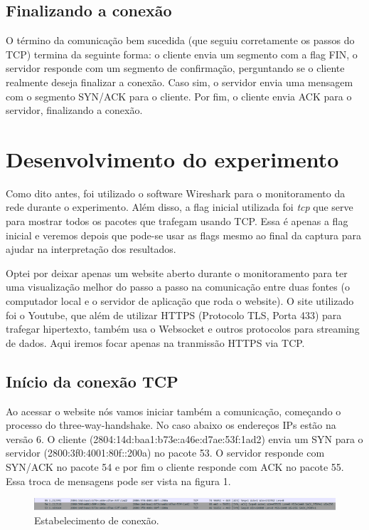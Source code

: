 \documentclass[12pt]{article}
\begin{document}
\subsection{Finalizando a conexão}

O término da comunicação bem sucedida (que seguiu corretamente os passos do TCP) termina da seguinte forma: o cliente envia um segmento com a flag FIN, o servidor responde com um segmento de confirmação, perguntando se o cliente realmente deseja finalizar a conexão. Caso sim, o servidor envia uma mensagem com o segmento SYN/ACK para o cliente. Por fim, o cliente envia ACK para o servidor, finalizando a conexão.

\section{Desenvolvimento do experimento}

Como dito antes, foi utilizado o software Wireshark para o monitoramento da rede durante o experimento. Além disso, a flag inicial utilizada foi \emph{tcp} que serve para mostrar todos os pacotes que trafegam usando TCP. Essa é apenas a flag inicial e veremos depois que pode-se usar as flags mesmo ao final da captura para ajudar na interpretação dos resultados.

Optei por deixar apenas um website aberto durante o monitoramento para ter uma visualização melhor do passo a passo na comunicação entre duas fontes (o computador local e o servidor de aplicação que roda o website). O site utilizado foi o Youtube, que além de utilizar HTTPS (Protocolo TLS, Porta 433) para trafegar hipertexto, também usa o Websocket e outros protocolos para streaming de dados. Aqui iremos focar apenas na tranmissão HTTPS via TCP.

\subsection{Início da conexão TCP}

Ao acessar o website nós vamos iniciar também a comunicação, começando o processo do three-way-handshake. No caso abaixo os endereços IPs estão na versão 6. O cliente (2804:14d:baa1:b73e:a46e:d7ae:53f:1ad2) envia um SYN para o servidor (2800:3f0:4001:80f::200a) no pacote 53. O servidor responde com SYN/ACK no pacote 54 e por fim o cliente responde com ACK no pacote 55. Essa troca de mensagens pode ser vista na figura 1.

\begin{figure}[H]
    \centering
    \includegraphics[width=\linewidth]{stablished.png}
    \caption{Estabelecimento de conexão.}
\end{figure}
\end{document}
